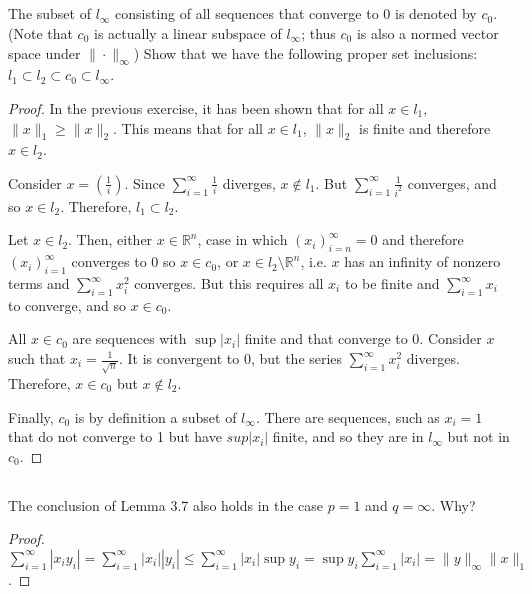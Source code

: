 \subsection{} The subset of $l_\infty$ consisting of all sequences that converge to 0 is denoted by $c_0$. (Note that $c_0$ is actually a linear subspace of $l_\infty$; thus $c_0$ is also a normed vector space under $\|\cdot\|_\infty$) Show that we have the following proper set inclusions: $l_1 \subset l_2 \subset c_0  \subset l_\infty$. 


\begin{proof}
In the previous exercise, it has been shown that for all $x\in l_1$, $\|x\|_1 \geq \|x\|_2$. This means that for all $x \in l_1$, $\|x\|_2$ is finite and therefore $x \in l_2$.

Consider $x = (\frac{1}{i})$. Since $\sum_{i=1}^\infty \frac{1}{i}$ diverges, $x \notin l_1$. But $\sum_{i=1}^\infty \frac{1}{i^2}$ converges, and so $x \in l_2$. Therefore, $l_1 \subset l_2$.

Let $x \in l_2$. Then, either $x \in \mathbb{R}^n$, case in which $(x_i)_{i=n}^\infty = 0$ and therefore $(x_i)_{i=1}^\infty$ converges to 0 so $x \in c_0$, or $x \in l_2 \setminus \mathbb{R}^n$, i.e. $x$ has an infinity of nonzero terms and $\sum_{i=1}^\infty x_i^2$ converges. But this requires all $x_i$ to be finite and $\sum_{i=1}^\infty x_i$ to converge, and so $x \in c_0$.

All $x \in c_0$ are sequences with $\sup |x_i|$ finite and that converge to 0. Consider $x$ such that $x_i = \frac{1}{\sqrt{n}}$. It is convergent to 0, but the series $\sum_{i=1}^\infty x_i^2$ diverges. Therefore, $x\in c_0$ but $x \notin l_2$.

Finally, $c_0$ is by definition a subset of $l_\infty$. There are sequences, such as $x_i = 1$ that do not converge to 1 but have $sup |x_i|$ finite, and so they are in $l_\infty$ but not in $c_0$.

\end{proof}


\subsection{} The conclusion of Lemma 3.7 also holds in the case $p = 1$ and $q = \infty$. Why?

\begin{proof}

$\sum_{i=1}^\infty |x_i y_i| = \sum_{i=1}^\infty |x_i||y_i| \leq \sum_{i=1}^\infty |x_i| \sup y_i = \sup y_i \sum_{i=1}^\infty |x_i| = \|y\|_\infty \|x\|_1$.

\end{proof}

